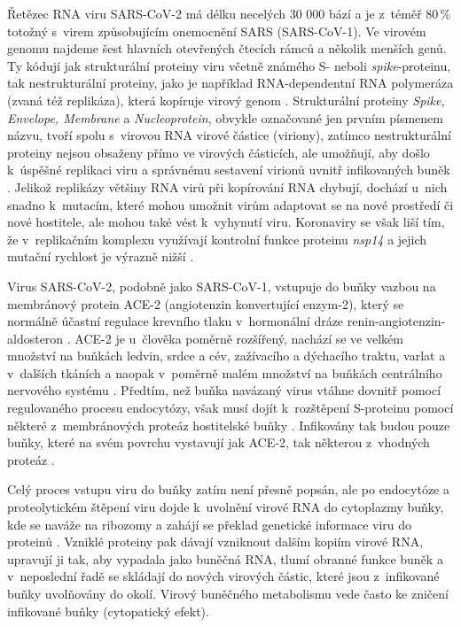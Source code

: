 Řetězec RNA viru SARS-CoV-2 má délku necelých 30 000 bází a je z~téměř 80\,\% totožný s~virem způsobujícím onemocnění SARS (SARS-CoV-1). Ve virovém genomu najdeme šest hlavních otevřených čtecích rámců a několik menších genů. Ty kódují jak strukturální proteiny viru včetně známého S- neboli \textit{spike}-proteinu, tak nestrukturální proteiny, jako je například RNA-dependentní RNA polymeráza (zvaná též replikáza), která kopíruje virový genom \cite{Chan:2020}. Strukturální proteiny \textit{Spike, Envelope, Membrane} a \textit{Nucleoprotein}, obvykle označované jen prvním pís\-me\-nem názvu, tvoří spolu s~virovou RNA virové částice (viriony), zatímco nestrukturální proteiny nejsou obsaženy přímo ve virových částicích, ale umožňují, aby došlo k~ú\-spěš\-né replikaci viru a správnému sestavení virionů uvnitř infikovaných buněk \cite{Mittal:2020}. Jelikož replikázy většiny RNA virů při kopírování RNA chybují, dochází u~nich snadno k~mutacím, které mohou umožnit virům adaptovat se na nové prostředí či nové hostitele, ale mohou také vést k~vyhynutí viru. Koronaviry se však liší tím, že v~replikačním komplexu využívají kontrolní funkce proteinu \textit{nsp14} a jejich mutační rychlost je výrazně nižší \cite{Robson:2020}.

Virus SARS-CoV-2, podobně jako SARS-CoV-1, vstupuje do buňky vazbou na membránový protein ACE-2 (angiotenzin konvertující enzym-2), který se normálně účastní regulace krevního tlaku v~hormonální dráze renin-angiotenzin-aldosteron \cite{Li:2017}. ACE-2 je u~člověka poměrně rozšířený, nachází se ve velkém množství na buňkách ledvin, srdce a cév, zažívacího a dýchacího traktu, varlat a v~dalších tkáních a naopak v~poměrně malém množství na buňkách centrálního nervového systému \cite{Harmer:2002}. Předtím, než buňka navázaný virus vtáhne dovnitř pomocí regulovaného procesu endocytózy, však musí dojít k~rozštěpení S-proteinu pomocí některé z~membránových proteáz hostitelské buňky \cite{Hoffmann:2020}. Infikovány tak budou pouze buňky, které na svém povrchu vystavují jak ACE-2, tak některou z~vhodných proteáz \cite{Murgolo:2021}.

Celý proces vstupu viru do buňky zatím není přesně popsán, ale po endocytóze a proteolytickém štěpení viru dojde k~uvolnění virové RNA do cytoplazmy buňky, kde se naváže na ribozomy a zahájí se překlad genetické informace viru do proteinů \cite{Khan:2020}. Vzniklé proteiny pak dávají vzniknout dalším kopiím virové RNA, upravují ji tak, aby vypadala jako buněčná RNA, tlumí obranné funkce buněk a v~neposlední řadě se skládají do nových virových částic, které jsou z~infikované buňky uvolňovány do okolí. Virový  buněčného metabolismu vede často ke zničení infikované buňky (cytopatický efekt).

